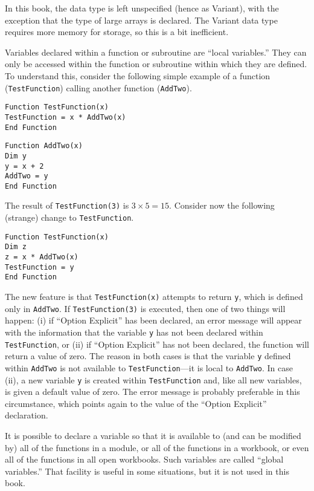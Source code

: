 {In this book, the data type is  left unspecified (hence as Variant), with the exception that the type of large arrays is declared.  The Variant data type requires more memory for storage, so this is a bit inefficient.  



Variables declared within a function or subroutine are ``local variables.''  They can only be accessed within the function or subroutine within which they are defined.  To understand this, consider the following  simple example  of a function (\verb!TestFunction!) calling another function (\verb!AddTwo!).
\small\begin{verbatim}
Function TestFunction(x)
TestFunction = x * AddTwo(x)
End Function
\end{verbatim}\normalsize

\small\begin{verbatim}
Function AddTwo(x)
Dim y
y = x + 2
AddTwo = y
End Function
\end{verbatim}\normalsize
The result of \verb!TestFunction(3)! is  $3 \times 5 = 15$.  
Consider now the following (strange) change to \verb!TestFunction!.
\small\begin{verbatim}
Function TestFunction(x)
Dim z
z = x * AddTwo(x)
TestFunction = y
End Function
\end{verbatim}\normalsize
The new feature is that \verb!TestFunction(x)! attempts to return \verb!y!, which is defined only in \verb!AddTwo!.   If  \verb!TestFunction(3)! is executed, then one of two things will happen: (i) if ``Option Explicit'' has been declared, an error message will appear with the information that the variable \verb!y! has not been declared within \verb!TestFunction!, or (ii) if ``Option Explicit'' has not been declared, the function will return a value of zero.  The reason in both cases is that the variable \verb!y! defined within \verb!AddTwo! is not available to  \verb!TestFunction!---it is local to \verb!AddTwo!.  In case (ii), a new variable \verb!y! is created within \verb!TestFunction! and, like all new variables, is given a default value of zero.  The error message is probably preferable in this circumstance, which points again to the value of the ``Option Explicit'' declaration.

It is possible to declare a variable so that it is available to (and can be modified by) all of the functions in a module, or all of the functions in a workbook, or even all of the functions in all open workbooks.  Such variables are called ``global variables.''  That facility is  useful in some situations, but it is not used in this book.

}
